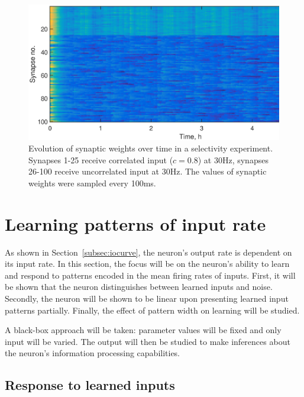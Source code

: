 \documentclass[a4paper,12pt]{report}
\theoremstyle{definition}
\begin{document}
\begin{figure}[h]
    \includegraphics[width=\textwidth]{figures/valid_selectivity_correlation.eps}
    \caption{Evolution of synaptic weights over time in a selectivity experiment. Synapses 1-25 receive correlated input ($c=0.8$) at 30Hz, synapses 26-100 receive uncorrelated input at 30Hz. The values of synaptic weights were sampled every 100ms.}
    \label{fig:selectivity_correlation}
\end{figure}









\section{Learning patterns of input rate}
\label{sec:learningpatterns}

As shown in Section~\ref{subsec:iocurve}, the neuron's output rate is dependent on its input rate. In this section, the focus will be on the neuron's ability to learn and respond to patterns encoded in the mean firing rates of inputs. First, it will be shown that the neuron distinguishes between learned inputs and noise. Secondly, the neuron will be shown to be linear upon presenting learned input patterns partially. Finally, the effect of pattern width on learning will be studied.

A black-box approach will be taken: parameter values will be fixed and only input will be varied. The output will then be studied to make inferences about the neuron's information processing capabilities.

\subsection{Response to learned inputs}
\label{subsec:learnedinputs}
\end{document}
